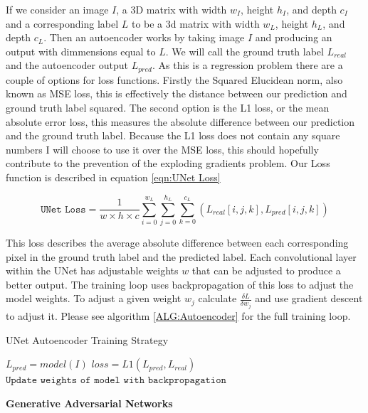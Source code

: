 \documentclass{UoYCSproject}
\begin{document}
If we consider an image $ I $, a 3D matrix with width $ w_I $, height $ h_I $, and depth $ c_I $ and a corresponding label $ L $ to be a 3d matrix with width $ w_L $, height $ h_L $, and depth $ c_L $. Then an autoencoder works by taking image $ I $ and producing an output with dimmensions equal to $ L $. We will call the ground truth label $ L_{real} $ and the autoencoder output $ L_{pred} $. As this is a regression problem there are a couple of options for loss functions. Firstly the Squared Elucidean norm, also known as MSE loss, this is effectively the distance between our prediction and ground truth label squared. The second option is the L1 loss, or the mean absolute error loss, this measures the absolute difference between our prediction and the ground truth label.
Because the L1 loss does not contain any square numbers I will choose to use it over the MSE loss, this should hopefully contribute to the prevention of the exploding gradients problem. Our Loss function is described in equation \ref{eqn:UNet Loss}

\begin{equation}
    \label{eqn:UNet Loss}
    \texttt{UNet Loss} = \frac{1}{w \times h \times c} \sum_{i = 0}^{w_L} \sum_{j = 0}^{h_L} \sum_{k = 0}^{c_L}(L_{real}[i,j,k], L_{pred}[i,j,k] ) 
\end{equation}

This loss describes the average absolute difference between each corresponding pixel in the ground truth label and the predicted label. Each convolutional layer within the UNet has adjustable weights $w$ that can be adjusted to produce a better output. The training loop uses backpropagation of this loss to adjust the model weights. To adjust a given weight $w_j$ calculate $ \frac{\delta L}{\delta w_j} $ and use gradient descent to adjust it. Please see algorithm \ref{ALG:Autoencoder} for the full training loop.

\begin{algorithm}
\caption{UNet Autoencoder Training Strategy}\label{ALG:Autoencoder}
\begin{algorithmic}[1]
\State
\State $L_{pred} = model(I)$
\State $loss = L1( L_{pred}, L_{real} ) $
\State $\texttt{Update weights of model with backpropagation}$
\State
\EndFor
\EndFor
\end{algorithmic}
\end{algorithm}

\textbf{Generative Adversarial Networks}
\end{document}
